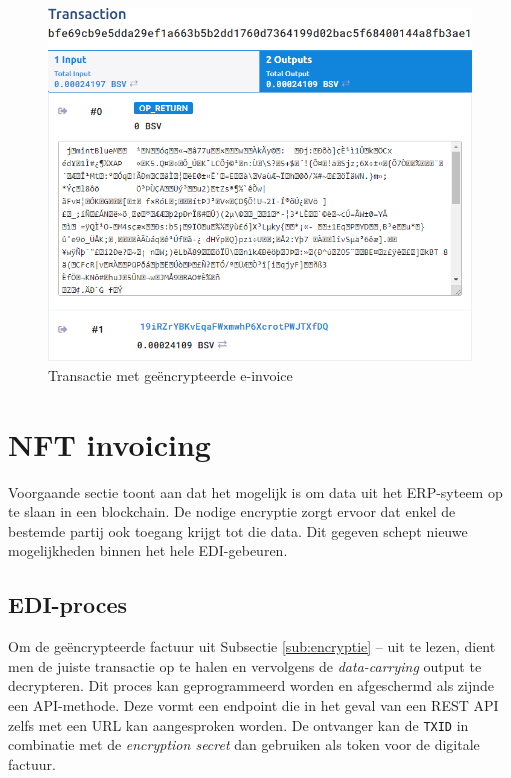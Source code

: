\begin{figure}[H]
	\centering
	\includegraphics[width=\linewidth]{img/proof-of-concept/transactie-encryptie.png}
	\caption{\label{fig:transactie-encryptie}Transactie met geëncrypteerde e-invoice}
\end{figure}

\pagebreak

\section{NFT invoicing}
\label{nft-invoicing}

Voorgaande sectie toont aan dat het mogelijk is om data uit het ERP-syteem op te slaan in een blockchain. De nodige encryptie zorgt ervoor dat enkel de bestemde partij ook toegang krijgt tot die data. Dit gegeven schept nieuwe mogelijkheden binnen het hele EDI-gebeuren.

\subsection{EDI-proces}
\label{sub:edi-proces}

Om de geëncrypteerde factuur uit Subsectie \ref{sub:encryptie} --  uit te lezen, dient men de juiste transactie op te halen en vervolgens de \textit{data-carrying} output te decrypteren. Dit proces kan geprogrammeerd worden en afgeschermd als zijnde een API-methode. Deze vormt een endpoint die in het geval van een REST API zelfs met een URL kan aangesproken worden. De ontvanger kan de \verb|TXID| in combinatie met de \textit{encryption secret} dan gebruiken als token voor de digitale factuur.

